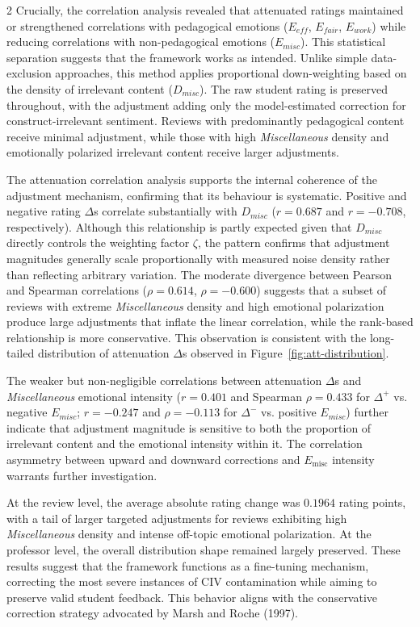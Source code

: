 \documentclass{article}
\begin{document}
\begin{multicols*}{2}
Crucially, the correlation analysis revealed that attenuated ratings maintained or strengthened correlations with pedagogical emotions ($E_{eff}$, $E_{fair}$, $E_{work}$) while reducing correlations with non-pedagogical emotions ($E_{misc}$). This statistical separation suggests that the framework works as intended. Unlike simple data-exclusion approaches, this method applies proportional down-weighting based on the density of irrelevant content ($D_{misc}$). The raw student rating is preserved throughout, with the adjustment adding only the model-estimated correction for construct-irrelevant sentiment. Reviews with predominantly pedagogical content receive minimal adjustment, while those with high \textit{Miscellaneous} density and emotionally polarized irrelevant content receive larger adjustments. 

The attenuation correlation analysis supports the internal coherence of the adjustment mechanism, confirming that its behaviour is systematic. Positive and negative rating $\Delta$s correlate substantially with $D_{misc}$ ($r = 0.687$ and $r = -0.708$, respectively). Although this relationship is partly expected given that $D_{misc}$ directly controls the weighting factor $\zeta$, the pattern confirms that adjustment magnitudes generally scale proportionally with measured noise density rather than reflecting arbitrary variation. The moderate divergence between Pearson and Spearman correlations ($\rho = 0.614$, $\rho = -0.600$) suggests that a subset of reviews with extreme \textit{Miscellaneous} density and high emotional polarization produce large adjustments that inflate the linear correlation, while the rank-based relationship is more conservative. This observation is consistent with the long-tailed distribution of attenuation $\Delta$s observed in Figure~\ref{fig:att-distribution}. 

The weaker but non-negligible correlations between attenuation $\Delta$s and \textit{Miscellaneous} emotional intensity ($r = 0.401$ and Spearman $\rho = 0.433$ for $\Delta^+$ vs. negative $E_{misc}$; $r = -0.247$ and $\rho = -0.113$ for $\Delta^-$ vs. positive $E_{misc}$) further indicate that adjustment magnitude is sensitive to both the proportion of irrelevant content and the emotional intensity within it. The correlation asymmetry between upward and downward corrections and $E_\text{misc}$ intensity warrants further investigation.

At the review level, the average absolute rating change was $0.1964$ rating points, with a tail of larger targeted adjustments for reviews exhibiting high \textit{Miscellaneous} density and intense off-topic emotional polarization. At the professor level, the overall distribution shape remained largely preserved. These results suggest that the framework functions as a fine-tuning mechanism, correcting the most severe instances of CIV contamination while aiming to preserve valid student feedback. This behavior aligns with the conservative correction strategy advocated by Marsh and Roche (1997).


\end{multicols*}
\end{document}
